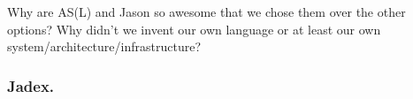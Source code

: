 Why are AS(L) and Jason so awesome that we chose them over the other options? Why didn't we invent our own language or at least our own system/architecture/infrastructure?







\subsubsection{Jadex.}




